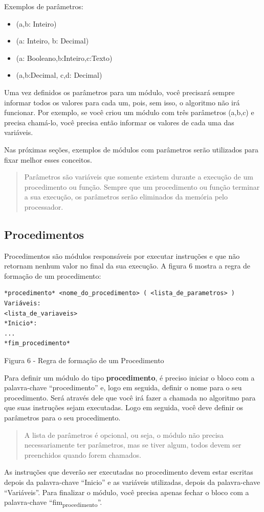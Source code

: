 \documentclass[11pt]{article}
\begin{document}
Exemplos de parâmetros:

\begin{itemize}
\item (a,b: Inteiro)
\item (a: Inteiro, b: Decimal)
\item (a: Booleano,b:Inteiro,c:Texto)
\item (a,b:Decimal, c,d: Decimal)
\end{itemize}

Uma vez definidos os parâmetros para um módulo, você precisará sempre informar todos os valores para cada um, pois, sem isso, o algoritmo não irá funcionar. Por exemplo, se você criou um módulo com três parâmetros (a,b,c) e precisa chamá-lo, você precisa então informar os valores de cada uma das variáveis.

Nas próximas seções, exemplos de módulos com parâmetros serão utilizados para fixar melhor esses conceitos.

\begin{quote}
Parâmetros são variáveis que somente existem durante a execução de um procedimento ou função. Sempre que um procedimento ou função terminar a sua execução, os parâmetros serão eliminados da memória pelo processador.
\end{quote}

\subsection{Procedimentos}
\label{sec:org994801f}
Procedimentos são módulos responsáveis por executar instruções e que não retornam nenhum valor no final da sua execução. A figura 6 mostra a regra de formação de um procedimento:

\begin{verbatim}
*procedimento* <nome_do_procedimento> ( <lista_de_parametros> )
Variáveis:
<lista_de_variaveis>
*Inicio*:
...
*fim_procedimento*
\end{verbatim}
Figura 6 - Regra de formação de um Procedimento

Para definir um módulo do tipo \textbf{procedimento}, é preciso iniciar o bloco com a palavra-chave “procedimento” e, logo em seguida, definir o nome para o seu procedimento. Será através dele que você irá fazer a chamada no algoritmo para que suas instruções sejam executadas. Logo em seguida, você deve definir os parâmetros para o seu procedimento.

\begin{quote}
A lista de parâmetros é opcional, ou seja, o módulo não precisa necessariamente ter parâmetros, mas se tiver algum, todos devem ser preenchidos quando forem chamados.
\end{quote}
As instruções que deverão ser executadas no procedimento devem estar escritas depois da palavra-chave “Inicio” e as variáveis utilizadas, depois da palavra-chave “Variáveis”. Para finalizar o módulo, você precisa apenas fechar o bloco com a palavra-chave “fim\textsubscript{procedimento}”.
\end{document}
